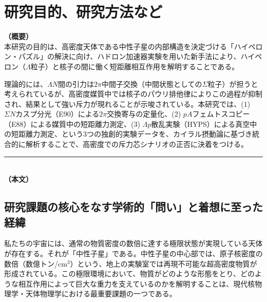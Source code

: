 \documentclass[11pt,a4j,dvipdfmx]{jarticle} 					%
\newcommand{\研究課題名}{加速器実験による短距離バリオン間相互作用の解明と中性子星ハイペロンパズルの解決}
\newcommand{\研究機関名}{東北大学}
\newcommand{\研究代表者氏名}{市川裕大}
\newcommand{\研究期間の最終元号年度}{13}  %
\begin{document}

\section{研究目的、研究方法など}

\noindent
\textbf{（概要）}\\
	本研究の目的は、高密度天体である中性子星の内部構造を決定づける「ハイペロン・パズル」の解決に向け、ハドロン加速器実験を用いた新手法により、ハイペロン（$\Lambda$粒子）と核子の間に働く短距離相互作用を解明することである。
	
	理論的には、$\Lambda N$間の引力は$2\pi$中間子交換（中間状態としての$\Sigma$粒子）が担うと考えられているが、高密度媒質中では核子のパウリ排他律によりこの過程が抑制され、結果として強い斥力が現れることが示唆されている。本研究では、(1) $\Sigma N$カスプ分光（E90）による$2\pi$交換寄与の定量化、(2) $pA$フェムトスコピー（E88）による媒質中の短距離力測定、(3) $\Lambda p$散乱実験（HYPS）による真空中の短距離力測定、という3つの独創的実験データを、カイラル摂動論に基づき統合的に解析することで、高密度での斥力芯シナリオの正否に決着をつける。
	
	\vspace*{7zw}	%

\noindent
\rule{\linewidth}{1pt}\\
\noindent
\textbf{（本文）}

\subsection{研究課題の核心をなす学術的「問い」と着想に至った経緯}
私たちの宇宙には、通常の物質密度の数倍に達する極限状態が実現している天体が存在する。それが「中性子星」である。中性子星の中心部では、原子核密度の数倍（数億トン/cm$^3$）という、地上の実験室では再現不可能な超高密度物質が形成されている。この極限環境において、物質がどのような形態をとり、どのような相互作用によって巨大な重力を支えているのかを解明することは、現代核物理学・天体物理学における最重要課題の一つである。
\end{document}
